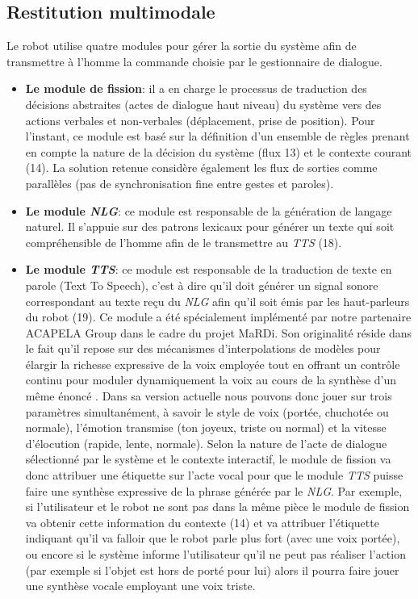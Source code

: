 \documentclass[a4paper,11pt,twoside]{StyleThese}
\begin{document}


\subsection{Restitution multimodale}
Le robot utilise quatre modules pour gérer la sortie du système afin de transmettre à l'homme la commande choisie par le gestionnaire de dialogue.

\begin{itemize}
\item \textbf{Le module de fission}: il a en charge
le processus de traduction des décisions abstraites (actes de dialogue haut niveau) du système vers des actions verbales et non-verbales (déplacement, prise de position).
Pour l’instant, ce module est basé sur la définition d’un ensemble de règles prenant
en compte la nature de la décision du système (flux 13) et le contexte courant (14).
La solution retenue considère également les flux de sorties comme
parallèles (pas de synchronisation fine entre gestes et paroles).

\item \textbf{Le module \textit{NLG}}: ce module est responsable de la génération de langage naturel. Il s'appuie sur des patrons lexicaux pour générer un texte qui soit compréhensible de l'homme afin de le transmettre au \textit{TTS} (18).

\item \textbf{Le module \textit{TTS}}: ce module est responsable de la traduction de texte en parole (Text To Speech), c'est à dire qu'il doit générer un signal sonore correspondant au texte reçu du \textit{NLG} afin qu'il soit émis par les haut-parleurs du robot (19). 
Ce module a été spécialement implémenté par
notre partenaire ACAPELA Group dans le cadre du projet MaRDi. Son originalité réside
dans le fait qu’il repose sur des mécanismes d’interpolations de modèles pour élargir la
richesse expressive de la voix employée tout en offrant un contrôle continu pour moduler
dynamiquement la voix au cours de la synthèse d’un même énoncé \cite{astrinaki2012}. Dans sa version actuelle nous pouvons donc jouer sur trois paramètres simultanément,
à savoir le style de voix (portée, chuchotée ou normale), l’émotion transmise
(ton joyeux, triste ou normal) et la vitesse d’élocution (rapide, lente, normale).
Selon la nature de l’acte de dialogue sélectionné par le système et le contexte interactif,
le module de fission va donc attribuer une étiquette sur l’acte vocal pour que le
module \textit{TTS} puisse faire une synthèse expressive de la phrase générée par le \textit{NLG}. Par
exemple, si l’utilisateur et le robot ne sont pas dans la même pièce le module de fission
va obtenir cette information du contexte (14) et va attribuer l’étiquette indiquant qu’il va falloir que le robot parle plus fort (avec
une voix portée), ou encore si le système informe l’utilisateur qu’il ne peut pas réaliser
l’action (par exemple si l’objet est hors de porté pour lui) alors il pourra faire jouer une
synthèse vocale employant une voix triste.



\end{itemize}
\end{document}
